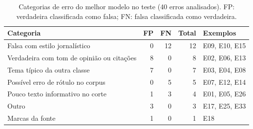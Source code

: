 \begin{table}[t]\centering\scriptsize
\caption{Categorias de erro do melhor modelo no teste (40 erros analisados). FP: verdadeira classificada como falsa; FN: falsa classificada como verdadeira.}\label{tab:errors}
\begin{tabular}{lrrrl}
\toprule
Categoria & FP & FN & Total & Exemplos \\
\midrule
Falsa com estilo jornalístico & 0 & 12 & 12 & E09, E10, E15 \\
Verdadeira com tom de opinião ou citações & 8 & 0 & 8 & E02, E06, E13 \\
Tema típico da outra classe & 7 & 0 & 7 & E03, E04, E08 \\
Possível erro de rótulo no corpus & 0 & 5 & 5 & E07, E12, E14 \\
Pouco texto informativo no corte & 1 & 3 & 4 & E01, E05, E26 \\
Outro & 3 & 0 & 3 & E17, E25, E33 \\
Marcas da fonte & 1 & 0 & 1 & E18 \\
\bottomrule
\end{tabular}
\end{table}

